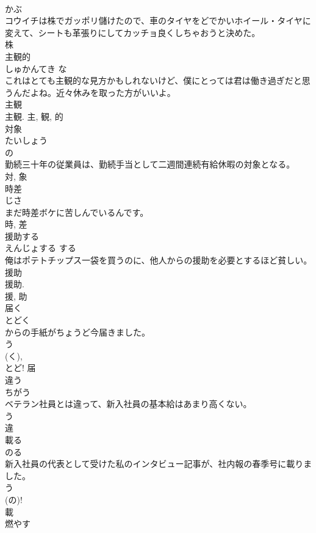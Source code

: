 \documentclass[8pt]{extreport}
\begin{document}
\begin{CJK}{UTF8}{min}
\\	かぶ	
\\	コウイチは株でガッポリ儲けたので、車のタイヤをどでかいホイール・タイヤに変えて、シートも革張りにしてカッチョ良くしちゃおうと決めた。	
\\	株	
\\	主観的	
\\	しゅかんてき	な 
\\	これはとても主観的な見方かもしれないけど、僕にとっては君は働き過ぎだと思うんだよね。近々休みを取った方がいいよ。	
\\	主観 
\\	主観.	主, 観, 的	
\\	対象	
\\	たいしょう	
\\	の 
\\	勤続三十年の従業員は、勤続手当として二週間連続有給休暇の対象となる。	
\\	対, 象	
\\	時差	
\\	じさ	
\\	まだ時差ボケに苦しんでいるんです。	
\\	時, 差	
\\	援助する	
\\	えんじょする	する 
\\	俺はポテトチップス一袋を買うのに、他人からの援助を必要とするほど貧しい。	
\\	援助 
\\	援助. 
\\	援, 助	
\\	届く	
\\	とどく	
\\	からの手紙がちょうど今届きました。	
\\	う 
\\	(く), 
\\	とど!	届	
\\	違う	
\\	ちがう	
\\	ベテラン社員とは違って、新入社員の基本給はあまり高くない。	
\\	う 
\\	違	
\\	載る	
\\	のる	
\\	新入社員の代表として受けた私のインタビュー記事が、社内報の春季号に載りました。	
\\	う 
\\	(の)! 
\\	載	
\\	燃やす	

\end{CJK}
\end{document}
